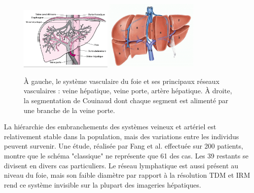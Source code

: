 \begin{figure}[!ht]
    \centering
    \includegraphics[width=0.4\textwidth]{Images/Liver_vasculature.png}
    \includegraphics[width=0.4\textwidth]{Images/Couinaud.png}
    \caption{À gauche, le système vasculaire du foie et ses principaux réseaux vasculaires : veine hépatique, veine porte, artère hépatique. À droite, la segmentation de Couinaud dont chaque segment est alimenté par une branche de la veine porte.\protect \footnotemark} 
    \label{fig:liver veins}
  \end{figure}


La hiérarchie des embranchements des systèmes veineux et artériel est relativement stable dans la population, mais des variations entre les individus peuvent survenir. Une étude, réalisée par Fang et al. \cite{Fang2012_Liver_vein_variations} effectuée sur 200 patients, montre que le schéma "classique" ne représente que 61 \percent{}des cas. Les 39 \percent{}restants se divisent en divers cas particuliers. Le réseau lymphatique est aussi présent au niveau du foie, mais son faible diamètre par rapport à la résolution TDM et IRM rend ce système invisible sur la plupart des imageries hépatiques. 


